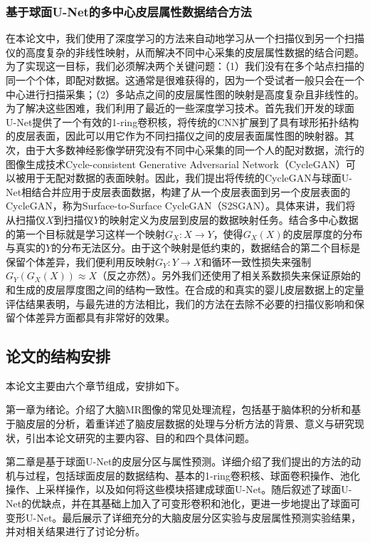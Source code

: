 \subsubsection{基于球面U-Net的多中心皮层属性数据结合方法}
在本论文中，我们使用了深度学习的方法来自动地学习从一个扫描仪到另一个扫描仪的高度复杂的非线性映射，从而解决不同中心采集的皮层属性数据的结合问题。为了实现这一目标，我们必须解决两个关键问题：（1）我们没有在多个站点扫描的同一个个体，即配对数据。这通常是很难获得的，因为一个受试者一般只会在一个中心进行扫描采集；（2）多站点之间的皮层属性图的映射是高度复杂且非线性的。为了解决这些困难，我们利用了最近的一些深度学习技术\cite{zhu2017unpaired,zhao2019spherical_ipmi}。首先我们开发的球面U-Net提供了一个有效的1-ring卷积核，将传统的CNN扩展到了具有球形拓扑结构的皮层表面，因此可以用它作为不同扫描仪之间的皮层表面属性图的映射器。其次，由于大多数神经影像学研究没有不同中心采集的同一个人的配对数据，流行的图像生成技术Cycle-consistent Generative Adversarial Network（CycleGAN）\cite{zhu2017unpaired}可以被用于无配对数据的表面映射。因此，我们提出将传统的CycleGAN与球面U-Net相结合并应用于皮层表面数据，构建了从一个皮层表面到另一个皮层表面的CycleGAN，称为Surface-to-Surface CycleGAN（S2SGAN）。具体来讲，我们将从扫描仪$X$到扫描仪$Y$的映射定义为皮层到皮层的数据映射任务。结合多中心数据的第一个目标就是学习这样一个映射$G_X: X\rightarrow Y$，使得$G_X(X)$的皮层厚度的分布与真实的$Y$的分布无法区分。由于这个映射是低约束的，数据结合的第二个目标是保留个体差异，我们便利用反映射$G_Y: Y\rightarrow X$和循环一致性损失来强制$G_Y(G_X(X))\approx X$（反之亦然）。另外我们还使用了相关系数损失来保证原始的和生成的皮层厚度图之间的结构一致性。在合成的和真实的婴儿皮层数据上的定量评估结果表明，与最先进的方法相比，我们的方法在去除不必要的扫描仪影响和保留个体差异方面都具有非常好的效果。


\subsection{论文的结构安排}
本论文主要由六个章节组成，安排如下。

第一章为绪论。介绍了大脑MR图像的常见处理流程，包括基于脑体积的分析和基于脑皮层的分析，着重详述了脑皮层数据的处理与分析方法的背景、意义与研究现状，引出本论文研究的主要内容、目的和四个具体问题。

第二章是基于球面U-Net的皮层分区与属性预测。详细介绍了我们提出的方法的动机与过程，包括球面皮层的数据结构、基本的1-ring卷积核、球面卷积操作、池化操作、上采样操作，以及如何将这些模块搭建成球面U-Net。随后叙述了球面U-Net的优缺点，并在其基础上加入了可变形卷积和池化，更进一步地提出了球面可变形U-Net。最后展示了详细充分的大脑皮层分区实验与皮层属性预测实验结果，并对相关结果进行了讨论分析。

